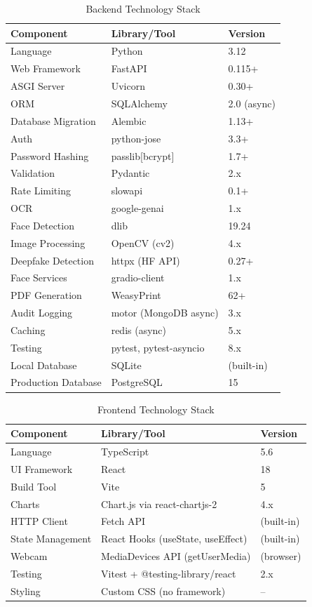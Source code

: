 \begin{table}[H]
\centering
\caption{Backend Technology Stack}
\begin{tabular}{@{}lll@{}}
\toprule
\textbf{Component} & \textbf{Library/Tool} & \textbf{Version} \\
\midrule
Language & Python & 3.12 \\
Web Framework & FastAPI & 0.115+ \\
ASGI Server & Uvicorn & 0.30+ \\
ORM & SQLAlchemy & 2.0 (async) \\
Database Migration & Alembic & 1.13+ \\
Auth & python-jose & 3.3+ \\
Password Hashing & passlib[bcrypt] & 1.7+ \\
Validation & Pydantic & 2.x \\
Rate Limiting & slowapi & 0.1+ \\
OCR & google-genai & 1.x \\
Face Detection & dlib & 19.24 \\
Image Processing & OpenCV (cv2) & 4.x \\
Deepfake Detection & httpx (HF API) & 0.27+ \\
Face Services & gradio-client & 1.x \\
PDF Generation & WeasyPrint & 62+ \\
Audit Logging & motor (MongoDB async) & 3.x \\
Caching & redis (async) & 5.x \\
Testing & pytest, pytest-asyncio & 8.x \\
Local Database & SQLite & (built-in) \\
Production Database & PostgreSQL & 15 \\
\bottomrule
\end{tabular}
\end{table}

\begin{table}[H]
\centering
\caption{Frontend Technology Stack}
\begin{tabular}{@{}lll@{}}
\toprule
\textbf{Component} & \textbf{Library/Tool} & \textbf{Version} \\
\midrule
Language & TypeScript & 5.6 \\
UI Framework & React & 18 \\
Build Tool & Vite & 5 \\
Charts & Chart.js via react-chartjs-2 & 4.x \\
HTTP Client & Fetch API & (built-in) \\
State Management & React Hooks (useState, useEffect) & (built-in) \\
Webcam & MediaDevices API (getUserMedia) & (browser) \\
Testing & Vitest + @testing-library/react & 2.x \\
Styling & Custom CSS (no framework) & -- \\
\bottomrule
\end{tabular}
\end{table}

